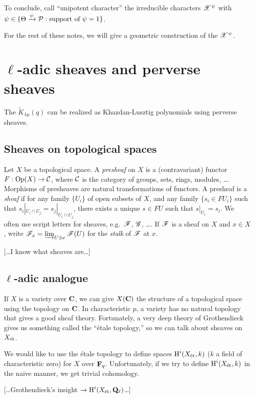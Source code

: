 \documentclass{article}
\begin{document}
To conclude, call ``unipotent character'' the irreducible characters 
$\mathscr{X}^\psi$ with $\psi\in \{\Theta\xrightarrow\psi\mathcal{P}:\text{support of }\psi=1\}$. 

For the rest of these notes, we will give a geometric construction of the 
$\mathscr{X}^\psi$. 





\section{\texorpdfstring{$\ell$}{l}-adic sheaves and perverse sheaves}

The $\widetilde K_{\lambda\mu}(q)$ can be realized as Khazdan-Lusztig polynomials 
using perverse sheaves. 


\subsection{Sheaves on topological spaces}

Let $X$ be a topological space. A \emph{presheaf} on $X$ is a (contravariant) 
functor $F:\operatorname{Op}(X) \to \mathcal{C}$, where $\mathcal{C}$ is the category of groups, sets, 
rings, modules, \ldots. Morphisms of presheaves are natural transformations of 
functors. A presheaf is a \emph{sheaf} if for any family $\{U_i\}$ of open 
subsets of $X$, and any family $\{s_i\in F U_i\}$ such that 
$s_i|_{U_i\cap U_j} = s_j|_{U_i\cap U_j}$, there exists a unique 
$s\in F U$ such that $s|_{U_i} = s_i$. We often use script letters for sheaves, 
e.g.\ $\mathscr{F}$, $\mathscr{G}$, \ldots. If $\mathscr{F}$ is a sheaf on $X$ and $x\in X$, write 
$\mathscr{F}_x=\varinjlim_{U\ni x} \mathscr{F}(U)$ for the \emph{stalk} of $\mathscr{F}$ at $x$. 

[\ldots I know what sheaves are\ldots]


\subsection{\texorpdfstring{$\ell$}{l}-adic analogue}

If $X$ is a variety over $\mathbf{C}$, we can give $X(\mathbf{C})$ the structure of a topological 
space using the topology on $\mathbf{C}$. In characteristic $p$, a variety has no natural 
topology that gives a good sheaf theory. Fortunately, a very deep theory of 
Grothendieck gives us something called the ``\'etale topology,'' so we can talk 
about sheaves on $X_{\textnormal{\'et}}$. 

We would like to use the \'etale topology to define spaces $\operatorname{H}^i(X_{\textnormal{\'et}},k)$ ($k$ a 
field of characteristic zero) for $X$ over $\mathbf{F}_q$. Unfortunately, if we try to 
define $\operatorname{H}^i(X_{\textnormal{\'et}}, k)$ in the naive manner, we get trivial cohomology. 

[\ldots Grothendieck's insight $\to\operatorname{H}^i(X_{\textnormal{\'et}}, \mathbf{Q}_\ell)$\ldots]







\end{document}
